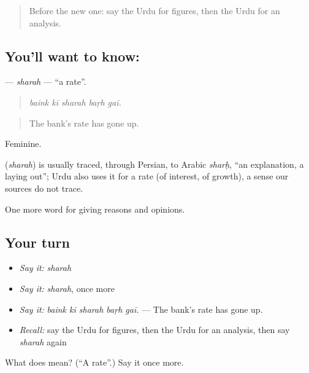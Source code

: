 \begin{quote}
Before the new one: say the Urdu for figures, then the Urdu for an analysis.
\end{quote}

\subsection*{You'll want to know: }
\textbf{} — \emph{sharah} — \textquotedblleft{}a rate\textquotedblright{}.

\begin{quote}
    
\end{quote}

\begin{quote}
\emph{baink kī sharah baṛh gaī.}
\end{quote}

\begin{quote}
The bank's rate has gone up.
\end{quote}

Feminine.

\begin{cousinweb}
\textbf{} (\emph{sharah}) is usually traced, through Persian, to Arabic \emph{sharḥ}, \textquotedblleft{}an explanation, a laying out\textquotedblright{}; Urdu also uses it for a rate (of interest, of growth), a sense our sources do not trace.
\end{cousinweb}

\begin{grammarlens}[title={What you've built}]
One more word for giving reasons and opinions.
\end{grammarlens}

\subsection*{Your turn}
\begin{itemize}
\raggedright
  \item \emph{Say it:} \emph{sharah}
  \item \emph{Say it:} \emph{sharah}, once more
  \item \emph{Say it:} \emph{baink kī sharah baṛh gaī.} — The bank's rate has gone up.
  \item \emph{Recall:} say the Urdu for figures, then the Urdu for an analysis, then say \emph{sharah} again
\end{itemize}

\begin{tcolorbox}[breakable,colback=teal!4,colframe=teal!35!black,title={Before you move on}]
What does  mean? (\textquotedblleft{}A rate\textquotedblright{}.) Say it once more.
\end{tcolorbox}
